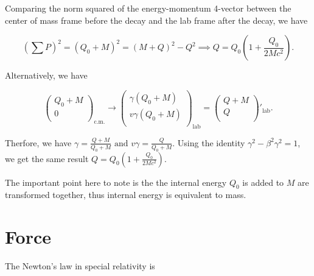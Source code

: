 \documentclass[english,a4paper,12pt]{report}
\begin{document}
{Comparing the norm squared of the energy-momentum 4-vector between the center of mass frame before the decay and the lab frame after the decay, we have

\begin{equation}
    \left( \sum P \right)^2 = (Q_0 + M)^2 = (M + Q)^2 - Q^2 \implies Q = Q_0 \left( 1 + \frac{Q_0 }{2Mc^2} \right).
\end{equation}

Alternatively, we have

\begin{equation}
    \begin{pmatrix}
         Q_0 + M \\
         0 \\
    \end{pmatrix}_{\text{c.m.} }  \rightarrow \begin{pmatrix}
         \gamma (Q_0 + M) \\
         v \gamma (Q_0 + M) \\
    \end{pmatrix}_{\text{lab} } = \begin{pmatrix}
         Q + M \\
         Q \\
    \end{pmatrix}'_{\text{lab} }.
\end{equation}

Therfore, we have \(\gamma = \frac{Q+M}{Q_0 + M} \text { and } v\gamma = \frac{Q}{Q_0 + M}\). Using the identity \(\gamma ^2- \beta ^2\gamma ^2 = 1\), we get the same result \(Q = Q_0 \left( 1 + \frac{Q_0 }{2Mc^2} \right)\).

The important point here to note is the the internal energy \(Q_0 \) is added to \(M\) are transformed together, thus internal energy is equivalent to mass.  
} 



\section{Force}

The Newton's law in special relativity is 
\end{document}

